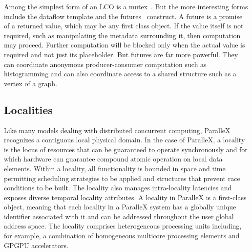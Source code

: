 \documentclass[floatfix]{revtex4}
\begin{document}
Among the simplest form of an LCO is a mutex~\cite{mutex}.
But the more interesting forms include the dataflow template and the
futures~\cite{futures2} construct. A future
is a promise of a returned value, which may be any first class object.
If the value itself is not required, such as manipulating the metadata
surrounding it, then computation may proceed. Further computation will be
blocked only when the actual value is required and not just its placeholder. 
But futures are far more powerful. They can coordinate
anonymous producer-consumer computation such as histogramming and
can also coordinate access to a shared structure such as a vertex
of a graph.

\subsection{Localities}
\label{subsec:localities}
Like many models dealing with distributed concurrent computing, ParalleX recognizes a
contiguous local physical domain. In the case of ParalleX, a locality is the locus of
resources that can be guaranteed to operate synchronously and for which
hardware can guarantee compound atomic operation on local data elements.
Within a locality, all functionality is bounded in space and time
permitting scheduling strategies to be applied and structures
that prevent race conditions to be built. The locality
also manages intra-locality latencies and exposes diverse temporal locality attributes.
A locality in ParalleX is a first-class object, meaning that each locality in a ParalleX
system has a globally unique identifier associated with it and can be addressed throughout
the user global address space. The locality comprises heterogeneous processing
units including, for example, a combination of homogeneous multicore processing elements and GPGPU
accelerators.
\end{document}

